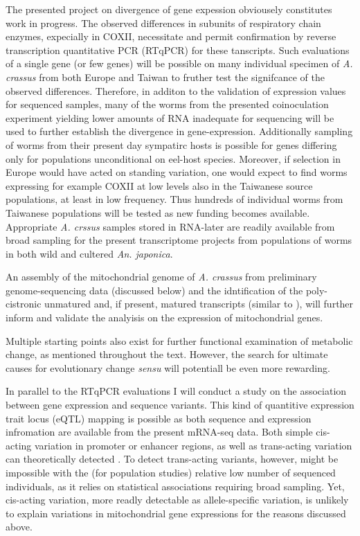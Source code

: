 The presented project on divergence of gene expession obviousely
constitutes work in progress. The observed differences in subunits of
respiratory chain enzymes, expecially in COXII, necessitate and permit
confirmation by reverse transcription quantitative PCR (RTqPCR) for
these tanscripts. Such evaluations of a single gene (or few genes)
will be possible on many individual specimen of \textit{A. crassus}
from both Europe and Taiwan to fruther test the signifcance of the
observed differences. Therefore, in additon to the validation of
expression values for sequenced samples, many of the worms from the
presented coinoculation experiment yielding lower amounts of RNA
inadequate for sequencing will be used to further establish the
divergence in gene-expression. Additionally sampling of worms from
their present day sympatirc hosts is possible for genes differing only
for populations unconditional on eel-host species. Moreover, if
selection in Europe would have acted on standing variation, one would
expect to find worms expressing for example COXII at low levels also
in the Taiwanese source populations, at least in low frequency. Thus
hundreds of individual worms from Taiwanese populations will be tested
as new funding becomes available. Appropriate \textit{A. crssus}
samples stored in RNA-later are readily available from broad sampling
for the present transcriptome projects from populations of worms in
both wild and cultered \textit{An. japonica}.

An assembly of the mitochondrial genome of \textit{A. crassus} from
preliminary genome-sequencing data (discussed below) and the
idntification of the poly-cistronic unmatured and, if present, matured
transcripts (similar to \cite{pmid19843606}), will further inform and
validate the analyisis on the expression of mitochondrial genes.

Multiple starting points also exist for further functional examination
of metabolic change, as mentioned throughout the text. However, the
search for ultimate causes for evolutionary change \textit{sensu}
\cite{mayr1961cause} will potentiall be even more rewarding.

In parallel to the RTqPCR evaluations I will conduct a study on the
association between gene expression and sequence variants. This kind
of quantitive expression trait locus (eQTL) mapping is possible as
both sequence and expression infromation are available from the
present mRNA-seq data. Both simple cis-acting variation in promoter or
enhancer regions, as well as trans-acting variation can theoretically
detected \cite{pmid21838806}. To detect trans-acting variants,
however, might be impossible with the (for population studies)
relative low number of sequenced individuals, as it relies on
statistical associations requiring broad sampling. Yet, cis-acting
variation, more readly detectable as allele-specific variation, is
unlikely to explain variations in mitochondrial gene expressions for
the reasons discussed above.

